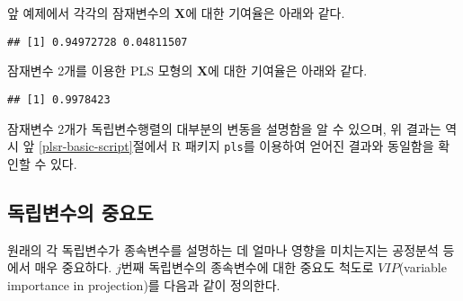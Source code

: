 \documentclass[]{book}
\newenvironment{Shaded}{\begin{snugshade}}{\end{snugshade}}
\newcommand{\KeywordTok}[1]{\textcolor[rgb]{0.13,0.29,0.53}{\textbf{#1}}}
\newcommand{\NormalTok}[1]{#1}
\newcommand{\OperatorTok}[1]{\textcolor[rgb]{0.81,0.36,0.00}{\textbf{#1}}}
\newcommand{\StringTok}[1]{\textcolor[rgb]{0.31,0.60,0.02}{#1}}
\begin{document}
앞 예제에서 각각의 잠재변수의 \(\mathbf{X}\)에 대한 기여율은 아래와 같다.

\begin{Shaded}
\end{Shaded}

\begin{verbatim}
## [1] 0.94972728 0.04811507
\end{verbatim}

잠재변수 2개를 이용한 PLS 모형의 \(\mathbf{X}\)에 대한 기여율은 아래와 같다.

\begin{Shaded}
\end{Shaded}

\begin{verbatim}
## [1] 0.9978423
\end{verbatim}

잠재변수 2개가 독립변수행렬의 대부분의 변동을 설명함을 알 수 있으며, 위 결과는 역시 앞 \ref{plsr-basic-script}절에서 R 패키지 \texttt{pls}를 이용하여 얻어진 결과와 동일함을 확인할 수 있다.

\hypertarget{plsr-variable-importance}{%
\subsection{독립변수의 중요도}\label{plsr-variable-importance}}

원래의 각 독립변수가 종속변수를 설명하는 데 얼마나 영향을 미치는지는 공정분석 등에서 매우 중요하다. \(j\)번째 독립변수의 종속변수에 대한 중요도 척도로 \(VIP\)(variable importance in projection)를 다음과 같이 정의한다.
\end{document}

